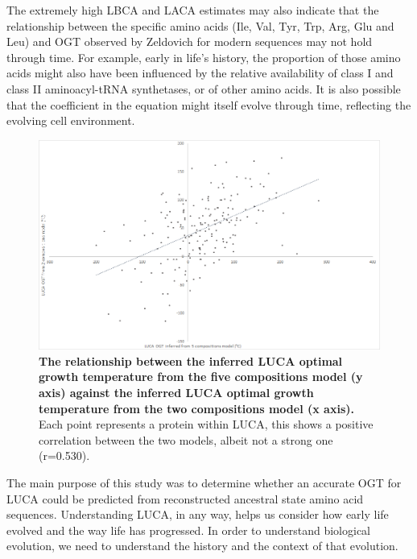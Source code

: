 The extremely high LBCA and LACA estimates may also indicate that the relationship between the specific amino acids (Ile, Val, Tyr, Trp, Arg, Glu and Leu) and OGT observed by Zeldovich \cite{zeldovich2007} for modern sequences may not hold through time. For example, early in life's history, the proportion of those amino acids might also have been influenced by the relative availability of class I and class II aminoacyl-tRNA synthetases, or of other amino acids. It is also possible that the coefficient in the equation might itself evolve through time, reflecting the evolving cell environment. 

\begin{figure}
\includegraphics[width=\textwidth]{figures/compare.png}
\centering
\caption{\textbf{The relationship between the inferred LUCA optimal growth temperature from the five compositions model (y axis) against the inferred LUCA optimal growth temperature from the two compositions model (x axis).} Each point represents a protein within LUCA, this shows a positive correlation between the two models, albeit not a strong one (r=0.530).}
\end{figure}

The main purpose of this study was to determine whether an accurate OGT for LUCA could be predicted from reconstructed ancestral state amino acid sequences. Understanding LUCA, in any way, helps us consider how early life evolved and the way life has progressed. In order to understand biological evolution, we need to understand the history and the context of that evolution. 

